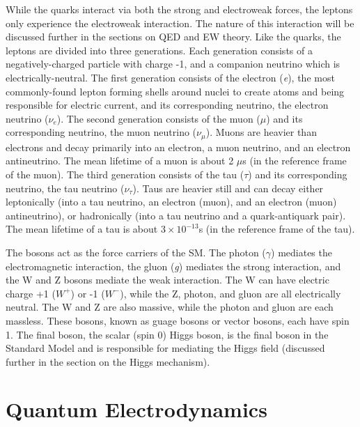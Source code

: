 While the quarks interact via both the strong and electroweak forces, the leptons only experience the electroweak interaction. The nature of this interaction will be discussed further in the sections on QED and EW theory. Like the quarks, the leptons are divided into three generations. Each generation consists of a negatively-charged particle with charge -1, and a companion neutrino which is electrically-neutral. The first generation consists of the electron (\textit{e}), the most commonly-found lepton forming shells around nuclei to create atoms and being responsible for electric current, and its corresponding neutrino, the electron neutrino (\textit{$\nu_{e}$}). The second generation consists of the muon (\textit{$\mu$}) and its corresponding neutrino, the muon neutrino (\textit{$\nu_{\mu}$}). Muons are heavier than electrons and decay primarily into an electron, a muon neutrino, and an electron antineutrino. The mean lifetime of a muon is about 2 $\mu$s (in the reference frame of the muon). The third generation consists of the tau (\textit{$\tau$}) and its corresponding neutrino, the tau neutrino (\textit{$\nu_{\tau}$}). Taus are heavier still and can decay either leptonically (into a tau neutrino, an electron (muon), and an electron (muon) antineutrino), or hadronically (into a tau neutrino and a quark-antiquark pair). The mean lifetime of a tau is about $3 \times 10^{-13}$s (in the reference frame of the tau).

The bosons act as the force carriers of the SM. The photon (\textit{$\gamma$}) mediates the electromagnetic interaction, the gluon (\textit{g}) mediates the strong interaction, and the W and Z bosons mediate the weak interaction. The W can have electric charge +1 (\textit{$W^{+}$}) or -1 (\textit{$W^{-}$}), while the Z, photon, and gluon are all electrically neutral. The W and Z are also massive, while the photon and gluon are each massless. These bosons, known as guage bosons or vector bosons, each have spin 1. The final boson, the scalar (spin 0) Higgs boson, is the final boson in the Standard Model and is responsible for mediating the Higgs field (discussed further in the section on the Higgs mechanism).

\section{Quantum Electrodynamics}

